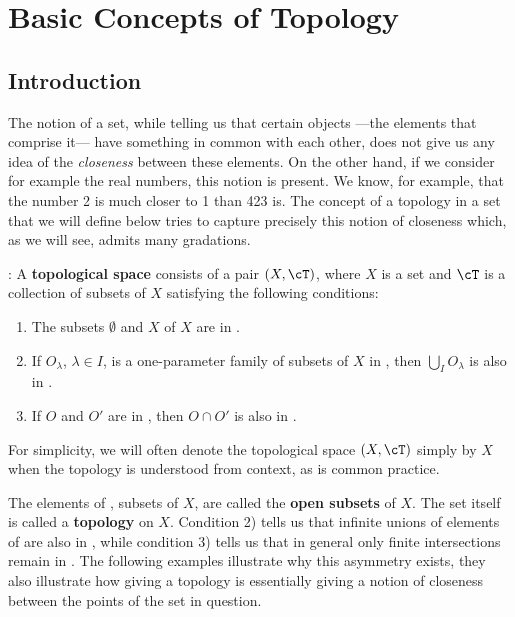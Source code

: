 
%

\chapter{Basic Concepts of Topology}


\section{Introduction}

The notion of a set, while telling us that certain objects ---the elements that comprise it--- have something in common with each other, does not give us any idea of the {\it closeness} between these elements. On the other hand, if we consider for example the real numbers, this notion is present. We know, for example, that the number 2 is much closer to 1 than 423 is. The concept of a topology in a set that we will define below tries to capture precisely this notion of closeness which, as we will see, admits many gradations.

: A {\bf topological space} consists of a pair $(X, \cT)$, where $X$ is a set and $\cT$ is a collection of subsets of $X$ satisfying the following conditions:

\begin{enumerate} \item The subsets $\emptyset$ and $X$ of $X$ are in \cT. \item If $O_{\lambda}$, $\lambda \in I$, is a one-parameter family of subsets of $X$ in \cT, then $\bigcup_I O_{\lambda}$ is also in \cT. \item If $O$ and $O'$ are in \cT, then $O \cap O'$ is also in \cT.

\end{enumerate}

For simplicity, we will often denote the topological space $(X, \cT)$ simply by $X$ when the topology is understood from context, as is common practice. 

The elements of \cT, subsets of $X$, are called the {\bf open subsets} of $X$. The set \cT itself is called a {\bf topology} on $X$. Condition 2) tells us that infinite unions of elements of \cT are also in \cT, while condition 3) tells us that in general only finite intersections remain in \cT. The following examples illustrate why this asymmetry exists, they also illustrate how giving a topology is essentially giving a notion of closeness between the points of the set in question.

